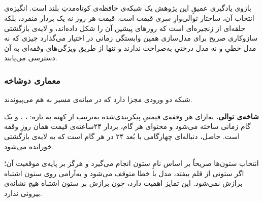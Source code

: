 %

\subsection{}
\label{sec:3-7-2}

بازوی یادگیری عمیقِ این پژوهش یک شبکه‌ی حافظه‌ی کوتاه‌مدتِ بلند است. انگیزه‌ی انتخاب آن،
ساختار توالی‌وارِ سری قیمت است: قیمت هر روز نه یک بردار منفرد، بلکه حلقه‌ای از
زنجیره‌ای است که روزهای پیشین آن را شکل داده‌اند، و لایه‌ی بازگشتی سازوکاری صریح برای
مدل‌سازی همین وابستگی زمانی در اختیار می‌گذارد \cite{zhang_deep_2020,
ugurlu_electricity_2018}  چیزی که نه مدل خطیِ  و نه مدل درختیِ
 به‌صراحت ندارند و تنها از طریق ویژگی‌های وقفه‌ای به آن دسترسی می‌یابند.

\subsubsection*{معماری دوشاخه}

شبکه دو ورودی مجزا دارد که در میانه‌ی مسیر به هم می‌پیوندند.

\textbf{شاخه‌ی توالی.} به‌ازای هر وقفه‌ی قیمتیِ پیکربندی‌شده  به‌ترتیب از کهنه به
تازه: ، ،  و   یک گام زمانی ساخته می‌شود و
محتوای هر گام، بردار ۲۴ساعته‌ی قیمت همان روزِ وقفه است. حاصل، دنباله‌ای چهارگامی با
بُعد ۲۴ در هر گام است که به لایه‌ی بازگشتی خورانده می‌شود.

انتخاب ستون‌ها صریحاً بر اساس نامِ ستون انجام می‌گیرد و هرگز بر پایه‌ی موقعیت آن؛ اگر
ستونی از قلم بیفتد، مدل با خطا متوقف می‌شود و به‌آرامی روی ستون اشتباه برازش
نمی‌شود. این تمایز اهمیت دارد، چون برازش بر ستون اشتباه هیچ نشانه‌ی بیرونی ندارد.

